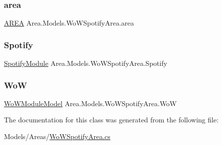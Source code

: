 \subsubsection{\texorpdfstring{area}{area}}
{\footnotesize\ttfamily \mbox{\hyperlink{classArea_1_1Models_1_1AREA}{A\+R\+EA}} Area.\+Models.\+Wo\+W\+Spotify\+Area.\+area\hspace{0.3cm}{\ttfamily [private]}}

\mbox{\label{classArea_1_1Models_1_1WoWSpotifyArea_ab3cb9e7674c672fb91ecf16427b4b761}} 
\subsubsection{\texorpdfstring{Spotify}{Spotify}}
{\footnotesize\ttfamily \mbox{\hyperlink{classArea_1_1Models_1_1SpotifyModule}{Spotify\+Module}} Area.\+Models.\+Wo\+W\+Spotify\+Area.\+Spotify\hspace{0.3cm}{\ttfamily [private]}}

\mbox{\label{classArea_1_1Models_1_1WoWSpotifyArea_a4be40242af61fddbed8b55ed66176059}} 
\subsubsection{\texorpdfstring{WoW}{WoW}}
{\footnotesize\ttfamily \mbox{\hyperlink{classArea_1_1Models_1_1WoWModuleModel}{Wo\+W\+Module\+Model}} Area.\+Models.\+Wo\+W\+Spotify\+Area.\+WoW\hspace{0.3cm}{\ttfamily [private]}}



The documentation for this class was generated from the following file\+:\begin{DoxyCompactItemize}
\item 
Models/\+Areas/\mbox{\hyperlink{WoWSpotifyArea_8cs}{Wo\+W\+Spotify\+Area.\+cs}}\end{DoxyCompactItemize}
